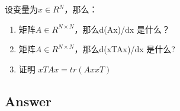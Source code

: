 \documentclass[
	12pt, %
]{fphw} %
\begin{document}
\begin{problem}
	设变量为$x\in R^N$，那么：
	\begin{enumerate}
		\item 矩阵$A\in R^{N\times N}$，那么d(Ax)/dx 是什么？
		\item 矩阵$A\in R^{N\times N}$，那么d(xTAx)/dx 是什么?
		\item 证明 $xTAx = tr(AxxT)$
	\end{enumerate}
	\medskip
\end{problem}


\subsection*{Answer} 
\end{document}
